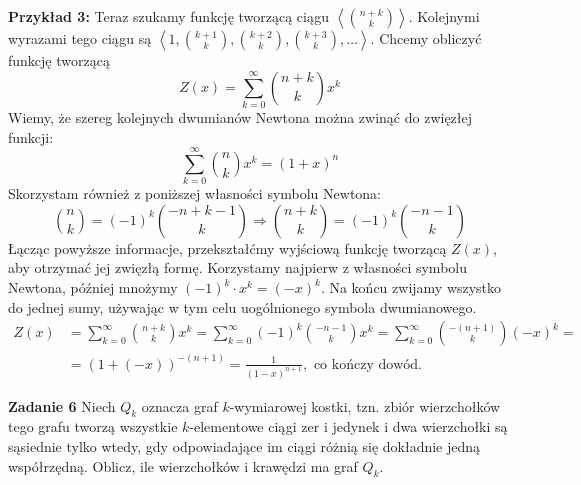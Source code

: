 \documentclass[a4paper,12pt]{article}
\newcommand{\sequence}[1]{\left\langle #1 \right\rangle} %
\begin{document}
\noindent \textbf{Przykład 3:} Teraz szukamy funkcję tworzącą ciągu $\sequence{\binom{n+k}{k}}$.
Kolejnymi wyrazami tego ciągu są $\sequence{1, \binom{k+1}{k}, \binom{k+2}{k}, \binom{k+3}{k},
\ldots}$. Chcemy obliczyć funkcję tworzącą 
\[
    Z(x) = \sum\limits_{k=0}^{\infty} \binom{n+k}{k} x^k
\]
Wiemy, że szereg kolejnych dwumianów Newtona można zwinąć do zwięzłej funkcji:
\[
    \sum\limits_{k=0}^{\infty} \binom{n}{k} x^k = (1+x)^n
\]
Skorzystam również z poniższej własności symbolu Newtona:
\[
    \binom{n}{k} = (-1)^k \binom{-n + k - 1}{k}
    \Longrightarrow \binom{n+k}{k} = (-1)^k \binom{-n - 1}{k}
\]
Łącząc powyższe informacje, przekształćmy wyjściową funkcję tworzącą $Z(x)$, aby
otrzymać jej zwięzłą formę. Korzystamy najpierw z własności symbolu Newtona, później
mnożymy $(-1)^k \cdot x^k = (-x)^k$. Na końcu zwijamy wszystko do jednej sumy,
używając w tym celu uogólnionego symbola dwumianowego. 
\begin{align*}
    Z(x)    &= \sum\limits_{k=0}^{\infty} \binom{n+k}{k} x^k
             = \sum\limits_{k=0}^{\infty} (-1)^k \binom{-n - 1}{k} x^k
             = \sum\limits_{k=0}^{\infty} \binom{-(n+1)}{k} (-x)^k = \\
            &= \left( 1 + (-x) \right)^{-(n+1)} 
             = \frac{1}{(1 - x)^{n+1}}, \text{ co kończy dowód.}
\end{align*}



\newpage
\noindent \textbf{Zadanie 6} \newline
Niech $Q_k$ oznacza graf $k$-wymiarowej kostki, tzn. zbiór wierzchołków tego grafu
tworzą wszystkie $k$-elementowe ciągi zer i jedynek i dwa wierzchołki są sąsiednie
tylko wtedy, gdy odpowiadające im ciągi różnią się dokładnie jedną współrzędną.
Oblicz, ile wierzchołków i krawędzi ma graf $Q_k$. \\
\end{document}
